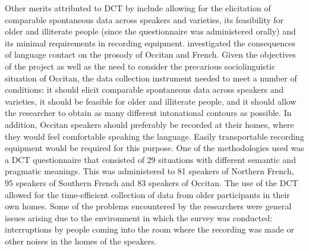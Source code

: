 \documentclass[output=paper]{LSP/langsci}
\begin{document}
Other merits attributed to DCT by \citet{Sichel-Bazin2015} include allowing for the elicitation of comparable spontaneous data across speakers and varieties, its feasibility for older and illiterate people (since the questionnaire was administered orally) and its minimal requirements in recording equipment. \citet{Sichel-Bazin2015} investigated the consequences of language contact on the prosody of Occitan and French. Given the objectives of the project as well as the need to consider the precarious sociolinguistic situation of Occitan, the data collection instrument needed to meet a number of conditions: it should elicit comparable spontaneous data across speakers and varieties, it should be feasible for older and illiterate people, and it should allow the researcher to obtain as many different intonational contours as possible. In addition, Occitan speakers should preferably be recorded at their homes, where they would feel comfortable speaking the language. Easily transportable recording equipment would be required for this purpose. One of the methodologies used was a DCT questionnaire that consisted of 29 situations with different semantic and pragmatic meanings. This was administered to 81 speakers of Northern French, 95 speakers of Southern French and 83 speakers of Occitan. The use of the DCT allowed for the time-efficient collection of data from older participants in their own homes. Some of the problems encountered by the researchers were general issues arising due to the environment in which the survey was conducted: interruptions by people coming into the room where the recording was made or other noises in the homes of the speakers. 
\end{document}

